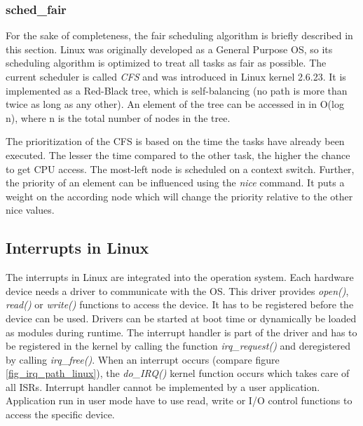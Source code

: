 \subsubsection{sched\_fair}
For the sake of completeness, the fair scheduling algorithm is briefly described in this section.
Linux was originally developed as a General Purpose \ac{OS}, so its scheduling algorithm is optimized to treat all tasks as fair as possible. 
The current scheduler is called \textit{\ac{CFS}} and was introduced in Linux kernel 2.6.23.
It is implemented as a Red-Black tree, which is self-balancing (no path is more than twice as long as any other).
An element of the tree can be accessed in in O(log n), where n is the total number of nodes in the tree.
\par
The prioritization of the \ac{CFS} is based on the time the tasks have already been executed. 
The lesser the time compared to the other task, the higher the chance to get \ac{CPU} access.
The most-left node is scheduled on a context switch.
Further, the priority of an element can be influenced using the \textit{nice} command. 
It puts a weight on the according node which will change the priority relative to the other nice values.

\subsection{Interrupts in Linux}\label{ss_interrupts_in_linux}
The interrupts in Linux are integrated into the operation system.
Each hardware device needs a driver to communicate with the \ac{OS}.
This driver provides \textit{open()}, \textit{read()} or \textit{write()} functions to access the device. 
It has to be registered before the device can be used.
Drivers can be started at boot time or dynamically be loaded as modules during runtime.
The interrupt handler is part of the driver and has to be registered in the kernel by calling the function \textit{irq\_request()} and deregistered by calling \textit{irq\_free()}.
When an interrupt occurs (compare figure \ref{fig_irq_path_linux}), the \textit{do\_IRQ()} kernel function occurs which takes care of all \acp{ISR}. 
Interrupt handler cannot be implemented by a user application.
Application run in user mode have to use read, write or \ac{I/O} control functions to access the specific device.

